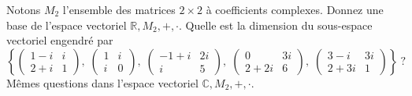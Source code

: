 \documentclass[12pt,french,oneside,a4paper]{memoir} %
\begin{document}
\begin{exo}
Notons $M_2$ l'ensemble des matrices $2 \times 2$ à
coefficients complexes. Donnez une base de l'espace vectoriel $\mathbb R,M_2,+,\cdot$. Quelle est la dimension du sous-espace vectoriel
engendré par
\begin{equation*}
\left\{
\left( \begin{array}{cc} 1-i &i\\2+i &1
\end{array}\right),\;
\left( \begin{array}{cc} 1 &i\\i &0
\end{array}\right),\;
\left( \begin{array}{cc} -1+i &2i\\i &5
\end{array}\right),\;
\left( \begin{array}{cc} 0 &3i\\2+2i &6
\end{array}\right),\;
\left( \begin{array}{cc} 3-i &3i\\2+3i &1
\end{array}\right)
\right\}~?
\end{equation*}
Mêmes questions dans l'espace vectoriel $\mathbb C,
M_2,+,\cdot$.
\end{exo}
\end{document}
